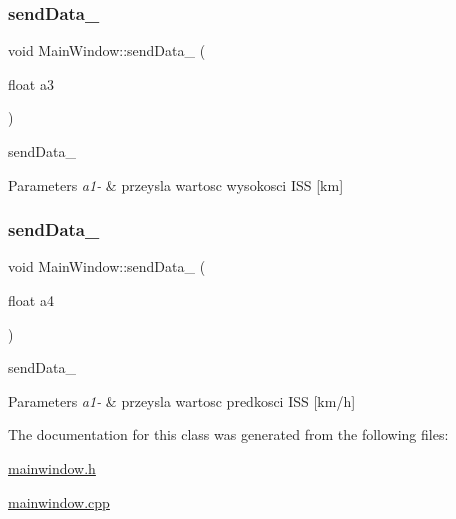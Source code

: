 \subsubsection{\texorpdfstring{send\+Data\+\_}{sendData\_3}}
{\footnotesize\ttfamily void Main\+Window\+::send\+Data\+\_ (\begin{DoxyParamCaption}\item[{float}]{a3 }\end{DoxyParamCaption})\hspace{0.3cm}{\ttfamily [signal]}}



send\+Data\+\_ 


\begin{DoxyParams}{Parameters}
{\em a1-\/} & przeysla wartosc wysokosci I\+SS \mbox{[}km\mbox{]} \\
\hline
\end{DoxyParams}
\mbox{\label{class_main_window_a37b6add722d1d8979d057d4ff7cfb356}} 
\subsubsection{\texorpdfstring{send\+Data\+\_}{sendData\_4}}
{\footnotesize\ttfamily void Main\+Window\+::send\+Data\+\_ (\begin{DoxyParamCaption}\item[{float}]{a4 }\end{DoxyParamCaption})\hspace{0.3cm}{\ttfamily [signal]}}



send\+Data\+\_ 


\begin{DoxyParams}{Parameters}
{\em a1-\/} & przeysla wartosc predkosci I\+SS \mbox{[}km/h\mbox{]} \\
\hline
\end{DoxyParams}


The documentation for this class was generated from the following files\+:\begin{DoxyCompactItemize}
\item 
\hyperlink{mainwindow_8h}{mainwindow.\+h}\item 
\hyperlink{mainwindow_8cpp}{mainwindow.\+cpp}\end{DoxyCompactItemize}
